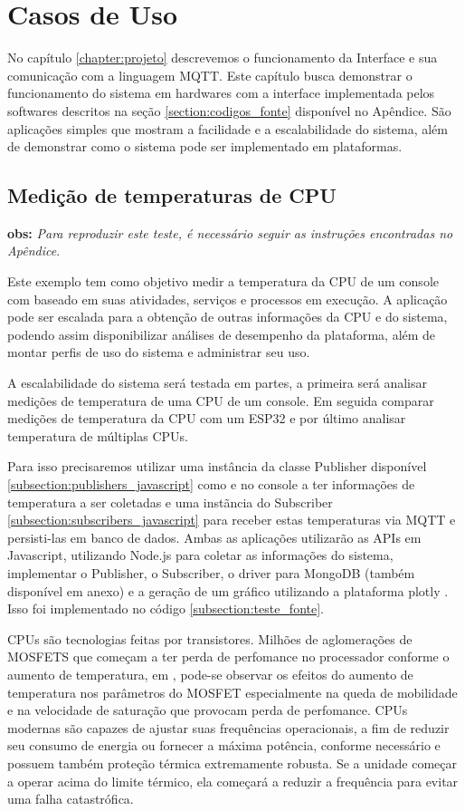 \chapter{Casos de Uso}
\label{chapter:casos_de_uso}

No capítulo \ref{chapter:projeto} descrevemos o funcionamento da Interface e sua comunicação com a linguagem MQTT. Este capítulo busca demonstrar o funcionamento do sistema em hardwares com a interface implementada pelos softwares descritos na seção \ref{section:codigos_fonte} disponível no Apêndice. São aplicações simples que mostram a facilidade e a escalabilidade do sistema, além de demonstrar como o sistema pode ser implementado em plataformas.

\section{Medição de temperaturas de CPU}
\label{section:temp_cpu}

\textbf{obs:} \textit{Para reproduzir este teste, é necessário seguir as instruções encontradas no Apêndice}.

Este exemplo tem como objetivo medir a temperatura da CPU de um console com baseado em suas atividades, serviços e processos em execução. A aplicação pode ser escalada para a obtenção de outras informações da CPU e do sistema, podendo assim disponibilizar análises de desempenho da plataforma, além de montar perfis de uso do sistema e administrar seu uso.

A escalabilidade do sistema será testada em partes, a primeira será analisar medições de temperatura de uma CPU de um console. Em seguida comparar medições de temperatura da CPU com um ESP32 e por último analisar temperatura de múltiplas CPUs.

Para isso precisaremos utilizar uma instância da classe Publisher disponível  \ref{subsection:publishers_javascript} como e no console a ter informações de temperatura a ser coletadas e uma instãncia do Subscriber \ref{subsection:subscribers_javascript} para receber estas temperaturas via MQTT e persisti-las em banco de dados. Ambas as aplicações utilizarão as APIs em Javascript, utilizando Node.js para coletar as informações do sistema, implementar o Publisher, o Subscriber, o driver para MongoDB (também disponível em anexo) e a geração de um gráfico utilizando a plataforma plotly \cite{plotly}. Isso foi implementado no código \ref{subsection:teste_fonte}.

CPUs são tecnologias feitas por transistores. Milhões de aglomerações de MOSFETS que começam a  ter perda de perfomance no processador conforme o aumento de temperatura, em \cite{jose}, pode-se observar os efeitos do aumento de  temperatura nos parâmetros do MOSFET especialmente na queda de mobilidade e na velocidade de saturação que provocam perda de perfomance. CPUs modernas são capazes de ajustar suas frequências operacionais, a fim de reduzir seu consumo de energia ou fornecer a máxima potência, conforme necessário e possuem também  proteção térmica extremamente robusta. Se a unidade começar a operar acima do limite térmico, ela começará a reduzir a frequência para evitar uma falha catastrófica.

